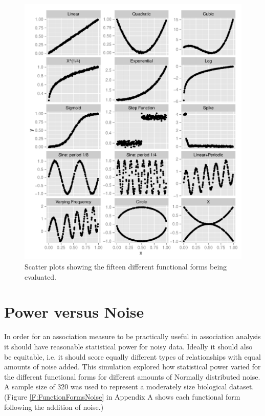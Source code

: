 \documentclass[a4paper, 12pt]{report}
\begin{document}
\begin{figure}[H]
\begin{centering}
\includegraphics[width=\textwidth]{FunctionFormsNoNoise.pdf}
\caption{Scatter plots showing the fifteen different functional forms being evaluated. } 
\label{F:FunctionForms}
\end{centering}
\end{figure}


\section{Power versus Noise}
In order for an association measure to be practically useful in association analysis it should have reasonable statistical power for noisy data. Ideally it should also be equitable, i.e. it should score equally different types of relationships with equal amounts of noise added. This simulation explored how statistical power varied for the different functional forms for different amounts of Normally distributed noise. A sample size of 320 was used to represent a moderately size biological dataset. (Figure \ref{F:FunctionFormsNoise} in Appendix A shows each functional form following the addition of noise.) 
\end{document}
